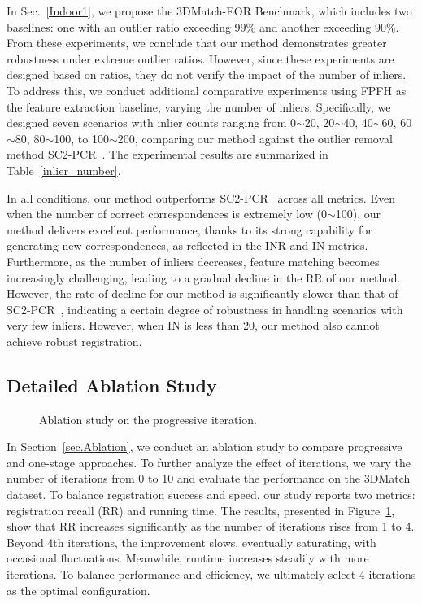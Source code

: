 In Sec.~\ref{Indoor1}, we propose the 3DMatch-EOR Benchmark, which includes two baselines: one with an outlier ratio exceeding 99\% and another exceeding 90\%. From these experiments, we conclude that our method demonstrates greater robustness under extreme outlier ratios. However, since these experiments are designed based on ratios, they do not verify the impact of the number of inliers. To address this, we conduct additional comparative experiments using FPFH as the feature extraction baseline, varying the number of inliers. Specifically, we designed seven scenarios with inlier counts ranging from 0$\sim$20, 20$\sim$40, 40$\sim$60, 60$\sim$80, 80$\sim$100, to 100$\sim$200, comparing our method against the outlier removal method SC2-PCR~\cite{chen2022sc2}. The experimental results are summarized in Table~\ref{inlier_number}.

In all conditions, our method outperforms SC2-PCR~\cite{chen2022sc2} across all metrics. Even when the number of correct correspondences is extremely low (0$\sim$100), our method delivers excellent performance, thanks to its strong capability for generating new correspondences, as reflected in the INR and IN metrics. Furthermore, 
as the number of inliers decreases, feature matching becomes increasingly challenging, leading to a gradual decline in the RR of our method. However, the rate of decline for our method is significantly slower than that of SC2-PCR~\cite{chen2022sc2}, indicating a certain degree of robustness in handling scenarios with very few inliers. However, when IN is less than 20, our method also cannot achieve robust registration.

\subsection{Detailed Ablation Study}

\begin{figure}[ht]
    \caption{
        Ablation study on the progressive iteration.
       }
    \label{iteration}
\end{figure}


In Section~\ref{sec.Ablation}, we conduct an ablation study to compare progressive and one-stage approaches. To further analyze the effect of iterations, we vary the number of iterations from 0 to 10 and evaluate the performance on the 3DMatch dataset. To balance registration success and speed, our study reports two metrics: registration recall (RR) and running time. The results, presented in Figure~\ref{iteration}, show that RR increases significantly as the number of iterations rises from 1 to 4. Beyond 4th iterations, the improvement slows, eventually saturating, with occasional fluctuations. Meanwhile, runtime increases steadily with more iterations. To balance performance and efficiency, we ultimately select 4 iterations as the optimal configuration.



